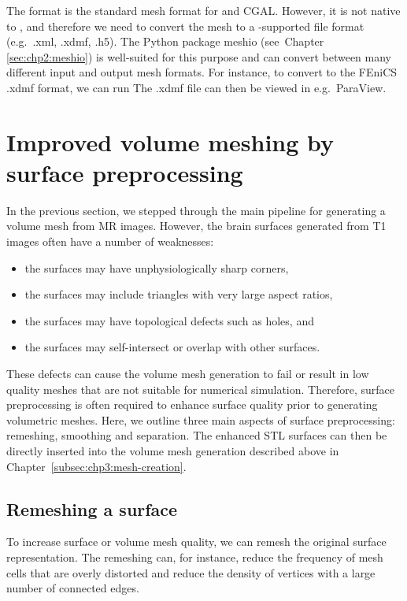 The  format is the standard mesh format for \svmtk{} and
CGAL. However, it is not native to \fenics{}, and therefore we need to
convert the mesh to a \fenics-supported file format (e.g.~.xml, .xdmf,
.h5). The Python package meshio (see~Chapter
\ref{sec:chp2:meshio}) is well-suited for this purpose and can
convert between many different input and output mesh formats. For
instance, to convert to the FEniCS .xdmf format, we can run
\noindent The .xdmf file can then be viewed in e.g.~ParaView.

\section{Improved volume meshing by surface preprocessing}
\label{sec:chp3:improved-volume-meshing}
In the previous section, we stepped through the main pipeline for
generating a volume mesh from MR images. However, the brain surfaces
generated from T1 images often have a number of weaknesses:
\begin{itemize}
\item the surfaces may have unphysiologically sharp corners,   
\item the surfaces may include triangles with very large aspect ratios, 
\item the surfaces may have topological defects such as holes, and
\item the surfaces may self-intersect or overlap with other surfaces.   
\end{itemize}
These defects can cause the volume mesh generation to fail or result
in low quality meshes that are not suitable for numerical
simulation. Therefore, surface preprocessing is often required to
enhance surface quality prior to generating volumetric meshes. Here,
we outline three main aspects of surface preprocessing: remeshing,
smoothing and separation. The enhanced STL surfaces can then be
directly inserted into the volume mesh generation described above in
Chapter~\ref{subsec:chp3:mesh-creation}.

\subsection{Remeshing a surface}
\label{subsubsec:chp3:mesh-creation:remeshing}

To increase surface or volume mesh quality, we can remesh the original
surface representation. The remeshing can, for instance, reduce the
frequency of mesh cells that are overly distorted and reduce the
density of vertices with a large number of connected edges.

